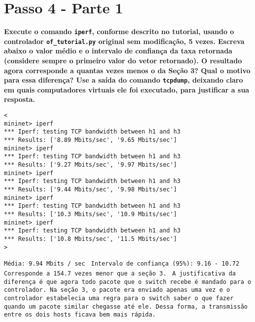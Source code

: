 \documentclass[12pt,letterpaper]{article}
\begin{document}
\section{Passo 4 - Parte 1}

\textbf{Execute o comando \texttt{iperf}, conforme descrito no
tutorial, usando o controlador \texttt{of\_tutorial.py} original sem
modificação, 5 vezes. Escreva abaixo o valor médio e o intervalo de
confiança da taxa retornada (considere sempre o primeiro valor do
vetor retornado). O resultado agora
corresponde a quantas vezes menos o da Seção 3? Qual o motivo para
essa diferença? Use a saída do comando \texttt{tcpdump}, deixando
claro em quais computadores virtuais ele foi executado, para
justificar a sua resposta.}

\begin{verbatim}
<
mininet> iperf
*** Iperf: testing TCP bandwidth between h1 and h3
*** Results: ['8.89 Mbits/sec', '9.65 Mbits/sec']
mininet> iperf
*** Iperf: testing TCP bandwidth between h1 and h3
*** Results: ['9.27 Mbits/sec', '9.97 Mbits/sec']
mininet> iperf
*** Iperf: testing TCP bandwidth between h1 and h3
*** Results: ['9.44 Mbits/sec', '9.98 Mbits/sec']
mininet> iperf
*** Iperf: testing TCP bandwidth between h1 and h3
*** Results: ['10.3 Mbits/sec', '10.9 Mbits/sec']
mininet> iperf
*** Iperf: testing TCP bandwidth between h1 and h3
*** Results: ['10.8 Mbits/sec', '11.5 Mbits/sec']
>

\end{verbatim}

\texttt{Média: 9.94 Mbits / sec \newline }
\texttt{Intervalo de confiança (95\%): 9.16 - 10.72 \newline}
\newline
\texttt{Corresponde a 154.7 vezes menor que a seção 3.}
\newline
\newline
\texttt{ A justificativa da diferença é que agora todo pacote que o switch recebe é mandado para o controlador. Na seção 3, o pacote era enviado apenas uma vez e o controlador estabelecia uma regra para o switch saber o que fazer quando um pacote similar chegasse até ele. Dessa forma, a transmissão entre os dois hosts ficava bem mais rápida. \newline \newline}
\end{document}
